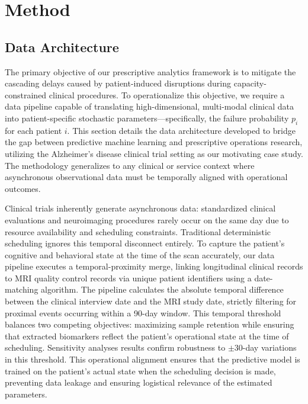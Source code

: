 \documentclass[11pt,a4paper]{article}
\begin{document}
\section{Method}


\subsection{Data Architecture}
\label{sec:data_architecture}

The primary objective of our prescriptive analytics framework is to mitigate the cascading delays caused by patient-induced disruptions during capacity-constrained clinical procedures. To operationalize this objective, we require a data pipeline capable of translating high-dimensional, multi-modal clinical data into patient-specific stochastic parameters---specifically, the failure probability $p_i$ for each patient $i$. This section details the data architecture developed to bridge the gap between predictive machine learning and prescriptive operations research, utilizing the Alzheimer's disease clinical trial setting as our motivating case study. The methodology generalizes to any clinical or service context where asynchronous observational data must be temporally aligned with operational outcomes.

Clinical trials inherently generate asynchronous data: standardized clinical evaluations and neuroimaging procedures rarely occur on the same day due to resource availability and scheduling constraints. Traditional deterministic scheduling ignores this temporal disconnect entirely. To capture the patient's cognitive and behavioral state at the time of the scan accurately, our data pipeline executes a temporal-proximity merge, linking longitudinal clinical records to MRI quality control records via unique patient identifiers using a date-matching algorithm. The pipeline calculates the absolute temporal difference between the clinical interview date and the MRI study date, strictly filtering for proximal events occurring within a 90-day window. This temporal threshold balances two competing objectives: maximizing sample retention while ensuring that extracted biomarkers reflect the patient's operational state at the time of scheduling. Sensitivity analyses results confirm robustness to $\pm$30-day variations in this threshold. This operational alignment ensures that the predictive model is trained on the patient's actual state when the scheduling decision is made, preventing data leakage and ensuring logistical relevance of the estimated parameters.
\end{document}
